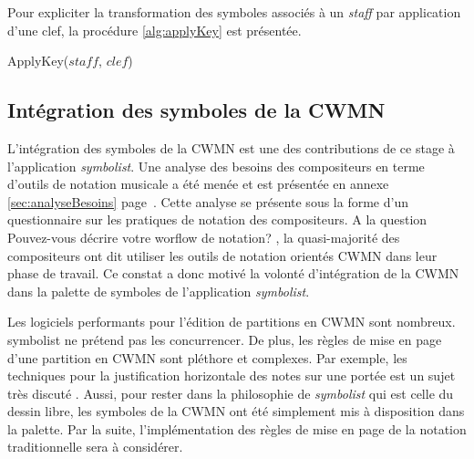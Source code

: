 Pour expliciter la transformation des symboles associés à un \textit{staff} par application d'une clef, la procédure \ref{alg:applyKey} est présentée.

\begin{procedure}[H]
	\caption{ApplyKey($staff$, $clef$)}
	\label{alg:applyKey}
    
    
     
	
    \DontPrintSemicolon
    \BlankLine
    
	
\end{procedure}


\subsection{Intégration des symboles de la CWMN}
\label{integrationCWMN}
L'intégration des symboles de la CWMN est une des contributions de ce stage à l'application \textit{symbolist}.
Une analyse des besoins des compositeurs en terme d'outils de notation musicale a été menée et est présentée en annexe \ref{sec:analyseBesoins} page~\pageref{sec:analyseBesoins}. Cette analyse se présente sous la forme d'un questionnaire sur les pratiques de notation des compositeurs. A la question \og Pouvez-vous décrire votre worflow de notation? \fg, la quasi-majorité des compositeurs ont dit utiliser les outils de notation orientés CWMN dans leur phase de travail. Ce constat a donc motivé la volonté d'intégration de la CWMN dans la palette de symboles de l'application \textit{symbolist}.

Les logiciels performants pour l'édition de partitions en CWMN sont nombreux. symbolist ne prétend pas les concurrencer. De plus, les règles de mise en page d'une partition en CWMN sont pléthore et complexes. Par exemple, les techniques pour la justification horizontale des notes sur une portée est un sujet très discuté \cite{blostein1991}. Aussi, pour rester dans la philosophie de \textit{symbolist} qui est celle du dessin libre, les symboles de la CWMN ont été simplement mis à disposition dans la palette. Par la suite, l'implémentation des règles de mise en page de la notation traditionnelle sera à considérer.

